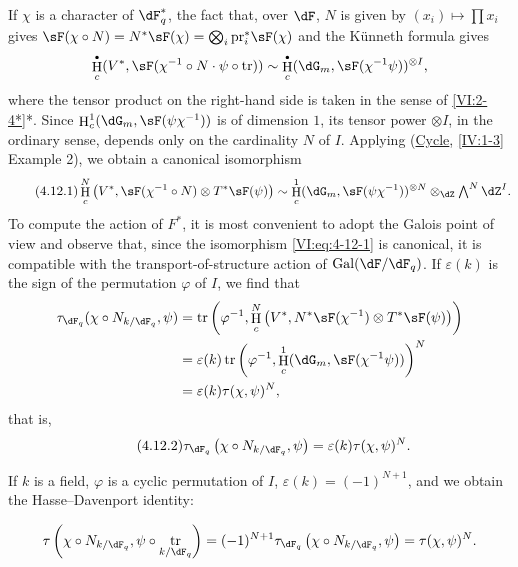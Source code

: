 \documentclass[oneside]{book}
\DeclareMathOperator{\gal}{Gal}
\DeclareMathOperator{\h}{H}
\DeclareMathOperator{\tr}{tr}
\newcounter{char}
\newcommand{\pr}{\mathrm{pr}} %
\theoremstyle{sga-source}
\theoremstyle{sga-source-dash}
\theoremstyle{sga-source-dotdash}
\theoremstyle{sga-source-number-note-dash}
\theoremstyle{sga-source-note-number-dotdash}
\theoremstyle{sga-source-example-dotdash}
\theoremstyle{sga-source-inline-number}
\theoremstyle{sga-source-bare-number}
\theoremstyle{sga-source}
\let\oldbullet\bullet
\renewcommand{\bullet}{\textnormal{\tiny$\oldbullet$}}
\newcommand{\PrintPage}[1]{}\newcommand{\MathPage}[1]{}\newcommand{\PrintCite}[2]{#1}\newcommand{\var}[3]{#2}
\begin{document}
If $\chi$ is a character of $\dF_q^\ast$, the fact that, over $\dF$, $N$ 
is given by $(x_i)\mapsto \prod x_i$ gives 
$\sF(\chi\circ N)=\var{N^\ast\sF(\chi) = \bigotimes_i \pr_i^\ast\sF(\psi)}{N^\ast\sF(\chi) = \bigotimes_i \pr_i^\ast\sF(\chi)}{S45-SOL-0830}$ 
and the K\"unneth formula gives 
\[
  \h_c^\bullet(V^\ast,\sF(\chi^{-1}\circ N\cdot \psi\circ \tr)) \sim \h_c^\bullet(\dG_m,\sF(\chi^{-1}\psi))^{\otimes I} \text{,} 
\]
where the tensor product on the right-hand side is taken in the sense of 
\ref{VI:2-4*}*. Since $\h_c^1(\dG_m,\sF(\psi\chi^{-1}))$ is of dimension 
$1$, its tensor power $\otimes I$, in the ordinary sense, depends only on 
\var{the cardinality $n$ of $I$}{the cardinality $N$ of $I$}{S45-SOL-0832}. Applying (\hyperref[IV]{Cycle}, \ref{IV:1-3} Example 
2), we obtain a canonical isomorphism 
\begin{equation*}\tag{4.12.1}\label{VI:eq:4-12-1}
  \h_c^N\left(V^\ast,\sF(\chi^{-1}\circ N)\otimes T^\ast \sF(\psi)\right) \sim \var{\h_c^1(\dG_m,\sF(\psi\chi^{-1})) \otimes_\dZ}{\h_c^1(\dG_m,\sF(\psi\chi^{-1}))^{\otimes N} \otimes_\dZ}{S45-SOL-0834} \textstyle \bigwedge^N \dZ^I \text{.}
\end{equation*}
To compute the action of $F^\ast$, it is most convenient to adopt the Galois 
point of view and observe that, since the isomorphism \eqref{VI:eq:4-12-1} is 
canonical, it is compatible with the transport-of-structure action of 
$\gal(\dF/\dF_q)$. If $\varepsilon(k)$ is the sign of the permutation 
$\varphi$ of $I$, we find that 
\begin{align*} 
  \tau_{\dF_q}(\chi\circ N_{k/\dF_q},\psi) 
    &= \tr\left(\varphi^{-1},\var{\h_c^N\left(V,}{\h_c^N\left(V^\ast,}{S45-SOL-0833}N^\ast\sF(\chi^{-1})\otimes T^\ast \sF(\psi)\right)\right) \\ 
    &= \varepsilon(k) \tr\left(\varphi^{-1},\h_c^1(\dG_m,\sF(\chi^{-1}\psi))\right)^N \\
    &= \varepsilon(k) \tau(\chi,\psi)^N \text{,} 
\end{align*}
that is, 
\begin{equation*}\tag{4.12.2}\label{VI:eq:4-12-2}
  \tau_{\dF_q}\left(\chi\circ N_{k/\dF_q},\psi\right) = \varepsilon(k) \tau(\chi,\psi)^N \text{.} 
\end{equation*}

If $k$ is a field, $\varphi$ is a cyclic permutation of $I$, 
$\varepsilon(k) = (-1)^{N+1}$, and we obtain the Hasse--Davenport identity: 
\PrintPage{203}
\[
  \tau\left(\chi\circ N_{k/\dF_q},\psi\circ \tr_{k/\dF_q}\right) = (-1)^{N+1} \tau_{\dF_q}\left(\chi\circ N_{k/\dF_q},\psi\right) = \tau(\chi,\psi)^N \text{.} 
\]
\end{document}
